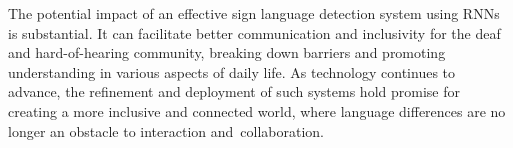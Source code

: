 The potential impact of an effective sign language detection system using RNNs is substantial. It can facilitate better communication and inclusivity for the deaf and hard-of-hearing community, breaking down barriers and promoting understanding in various aspects of daily life. As technology continues to advance, the refinement and deployment of such systems hold promise for creating a more inclusive and connected world, where language differences are no longer an obstacle to interaction and collaboration.
